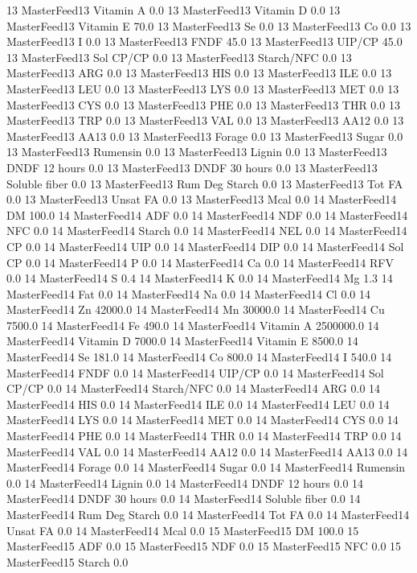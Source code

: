 \documentclass[letterpaper,10pt,english]{sphinxmanual}
\begin{document}
\begin{sphinxVerbatim}[commandchars=\\\{\},numbers=left,firstnumber=1,stepnumber=1]
13 MasterFeed13 Vitamin A 0.0
13 MasterFeed13 Vitamin D 0.0
13 MasterFeed13 Vitamin E 70.0
13 MasterFeed13 Se 0.0
13 MasterFeed13 Co 0.0
13 MasterFeed13 I 0.0
13 MasterFeed13 FNDF 45.0
13 MasterFeed13 UIP/CP 45.0
13 MasterFeed13 Sol CP/CP 0.0
13 MasterFeed13 Starch/NFC 0.0
13 MasterFeed13 ARG 0.0
13 MasterFeed13 HIS 0.0
13 MasterFeed13 ILE 0.0
13 MasterFeed13 LEU 0.0
13 MasterFeed13 LYS 0.0
13 MasterFeed13 MET 0.0
13 MasterFeed13 CYS 0.0
13 MasterFeed13 PHE 0.0
13 MasterFeed13 THR 0.0
13 MasterFeed13 TRP 0.0
13 MasterFeed13 VAL 0.0
13 MasterFeed13 AA\PYGZsh{}12 0.0
13 MasterFeed13 AA\PYGZsh{}13 0.0
13 MasterFeed13 \PYGZpc{} Forage 0.0
13 MasterFeed13 Sugar \PYGZpc{} 0.0
13 MasterFeed13 Rumensin 0.0
13 MasterFeed13 Lignin 0.0
13 MasterFeed13 DNDF 12 hours 0.0
13 MasterFeed13 DNDF 30 hours 0.0
13 MasterFeed13 Soluble fiber 0.0
13 MasterFeed13 Rum Deg Starch 0.0
13 MasterFeed13 Tot FA 0.0
13 MasterFeed13 Unsat FA 0.0
13 MasterFeed13 Mcal 0.0
14 MasterFeed14 DM 100.0
14 MasterFeed14 ADF 0.0
14 MasterFeed14 NDF 0.0
14 MasterFeed14 NFC 0.0
14 MasterFeed14 Starch 0.0
14 MasterFeed14 NEL 0.0
14 MasterFeed14 CP 0.0
14 MasterFeed14 UIP 0.0
14 MasterFeed14 DIP 0.0
14 MasterFeed14 Sol CP 0.0
14 MasterFeed14 P 0.0
14 MasterFeed14 Ca 0.0
14 MasterFeed14 RFV 0.0
14 MasterFeed14 S 0.4
14 MasterFeed14 K 0.0
14 MasterFeed14 Mg 1.3
14 MasterFeed14 Fat 0.0
14 MasterFeed14 Na 0.0
14 MasterFeed14 Cl 0.0
14 MasterFeed14 Zn 42000.0
14 MasterFeed14 Mn 30000.0
14 MasterFeed14 Cu 7500.0
14 MasterFeed14 Fe 490.0
14 MasterFeed14 Vitamin A 2500000.0
14 MasterFeed14 Vitamin D 7000.0
14 MasterFeed14 Vitamin E 8500.0
14 MasterFeed14 Se 181.0
14 MasterFeed14 Co 800.0
14 MasterFeed14 I 540.0
14 MasterFeed14 FNDF 0.0
14 MasterFeed14 UIP/CP 0.0
14 MasterFeed14 Sol CP/CP 0.0
14 MasterFeed14 Starch/NFC 0.0
14 MasterFeed14 ARG 0.0
14 MasterFeed14 HIS 0.0
14 MasterFeed14 ILE 0.0
14 MasterFeed14 LEU 0.0
14 MasterFeed14 LYS 0.0
14 MasterFeed14 MET 0.0
14 MasterFeed14 CYS 0.0
14 MasterFeed14 PHE 0.0
14 MasterFeed14 THR 0.0
14 MasterFeed14 TRP 0.0
14 MasterFeed14 VAL 0.0
14 MasterFeed14 AA\PYGZsh{}12 0.0
14 MasterFeed14 AA\PYGZsh{}13 0.0
14 MasterFeed14 \PYGZpc{} Forage 0.0
14 MasterFeed14 Sugar \PYGZpc{} 0.0
14 MasterFeed14 Rumensin 0.0
14 MasterFeed14 Lignin 0.0
14 MasterFeed14 DNDF 12 hours 0.0
14 MasterFeed14 DNDF 30 hours 0.0
14 MasterFeed14 Soluble fiber 0.0
14 MasterFeed14 Rum Deg Starch 0.0
14 MasterFeed14 Tot FA 0.0
14 MasterFeed14 Unsat FA 0.0
14 MasterFeed14 Mcal 0.0
15 MasterFeed15 DM 100.0
15 MasterFeed15 ADF 0.0
15 MasterFeed15 NDF 0.0
15 MasterFeed15 NFC 0.0
15 MasterFeed15 Starch 0.0

\end{sphinxVerbatim}
\end{document}
